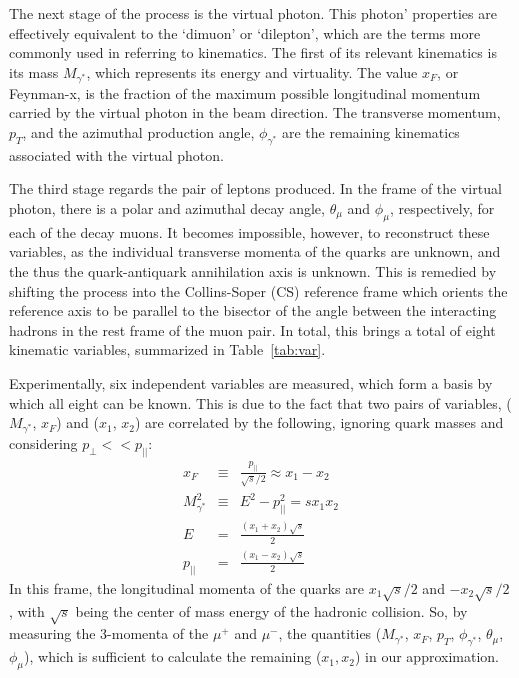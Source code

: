 The next stage of the process is the virtual photon. This photon' properties are effectively equivalent to the `dimuon' or `dilepton', which are the terms more commonly used in referring to kinematics. The first of its relevant kinematics is its mass $M_{\gamma^*}$, which represents its energy and virtuality. The value $x_F$, or Feynman-x, is the fraction of the maximum possible longitudinal momentum carried by the virtual photon in the beam direction. The transverse momentum, $p_T$, and the azimuthal production angle, $\phi_{\gamma^*}$ are the remaining kinematics associated with the virtual photon.

The third stage regards the pair of leptons produced. In the frame of the virtual photon, there is a polar and azimuthal decay angle, $\theta_\mu$ and $\phi_\mu$, respectively, for each of the decay muons. It becomes impossible, however, to reconstruct these variables, as the individual transverse momenta of the quarks are unknown, and the thus the quark-antiquark annihilation axis is unknown. This is remedied by shifting the process into the Collins-Soper (CS) reference frame\cite{PhysRevD.16.2219} which orients the reference axis to be parallel to the bisector of the angle between the interacting hadrons in the rest frame of the muon pair. In total, this brings a total of eight kinematic variables, summarized in Table~\ref{tab:var}.

Experimentally, six independent variables are measured, which form a basis by which all eight can be known. This is due to the fact that two pairs of variables, ($M_{\gamma^*}$, $x_F$) and ($x_1$, $x_2$) are correlated by the following, ignoring quark masses and considering $p_\perp << p_{||}$:
\begin{eqnarray}
x_F & \equiv & \frac{p_{||}}{\sqrt{s}/2} \approx x_1 - x_2 \label{eq:xf=x1-x2} \\
M_{\gamma^*}^2 & \equiv & E^2 - p_{||}^2  = s x_1 x_2 \label{eq:m=sx1x2} \\
E & = & \frac{(x_1 + x_2) \sqrt{s}}{2} \\
p_{||} & = & \frac{(x_1 - x_2)\sqrt{s}}{2}
\end{eqnarray}
In this frame, the longitudinal momenta of the quarks are $x_1 \sqrt{s}/2$ and $- x_2 \sqrt{s}/2$, with $\sqrt{s}$ being the center of mass energy of the hadronic collision. So, by measuring the 3-momenta of the $\mu^+$ and $\mu^-$, the quantities ($M_{\gamma^*}$, $x_F$, $p_T$, $\phi_{\gamma^*}$, $\theta_\mu$, $\phi_\mu$), which is sufficient to calculate the remaining ($x_1, x_2$) in our approximation.

